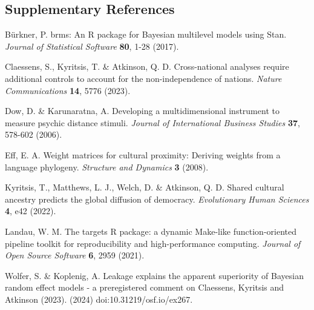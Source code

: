 \documentclass[
  11pt,
]{article}
\begin{document}
\subsection*{Supplementary References}

Bürkner, P. brms: An R package for Bayesian multilevel models using Stan. 
\textit{Journal of Statistical Software} \textbf{80}, 1-28 (2017).

Claessens, S., Kyritsis, T. \& Atkinson, Q. D. Cross-national analyses require 
additional controls to account for the non-independence of nations.
\textit{Nature Communications} \textbf{14}, 5776 (2023).

Dow, D. \& Karunaratna, A. Developing a multidimensional instrument to measure 
psychic distance stimuli. \textit{Journal of International Business Studies}
\textbf{37}, 578-602 (2006).

Eff, E. A. Weight matrices for cultural proximity: Deriving weights from a 
language phylogeny. \textit{Structure and Dynamics} \textbf{3} (2008).

Kyritsis, T., Matthews, L. J., Welch, D. \& Atkinson, Q. D. Shared cultural 
ancestry predicts the global diffusion of democracy. \textit{Evolutionary Human 
Sciences} \textbf{4}, e42 (2022).

Landau, W. M. The targets R package: a dynamic Make-like function-oriented
pipeline toolkit for reproducibility and high-performance computing.
\textit{Journal of Open Source Software} \textbf{6}, 2959 (2021).

Wolfer, S. \& Koplenig, A. Leakage explains the apparent superiority of Bayesian
random effect models - a preregistered comment on Claessens, Kyritsis and 
Atkinson (2023). (2024) doi:10.31219/osf.io/ex267.
\end{document}
